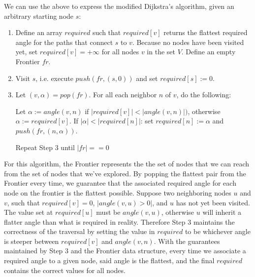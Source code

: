 \documentclass[12pt]{article}
\begin{document}
\par We can use the above to express the modified Dijkstra's algorithm, given an arbitrary starting node $s$:
\begin{enumerate}[Step 1]
  \item Define an array $required$ such that $required[v]$ returns the flattest required angle for the paths that connect $s$ to $v$. Because no nodes have been visited yet, set $required[v] = +\infty$ for all nodes $v$ in the set $V$. Define an empty Frontier $fr$.
  \item Visit $s$, i.e. execute $push(fr, (s, 0))$ and set $required[s] := 0$.
  \item Let $(v,\alpha) = pop(fr)$. For all each neighbor $n$ of $v$, do the following:
  \begin{displayquote}
    Let $\alpha := angle(v,n)$ if $|required[v]| < |angle(v,n)|)$, otherwise $\alpha := required[v]$. If $ |\alpha| < |required[n]|$: set $required[n] := \alpha$ and $push(fr, (n, \alpha))$.
  \end{displayquote}
  Repeat Step 3 until $|fr| == 0$
\end{enumerate}
\par For this algorithm, the Frontier represents the the set of nodes that we can reach from the set of nodes that we've explored. By popping the flattest pair from the Frontier every time, we guarantee that the associated required angle for each node on the frontier is the flattest possible. Suppose two neighboring nodes $u$ and $v$, such that $required[v] = 0$, $|angle(v,u) > 0|$, and $u$ has not yet been visited. The value set at $required[u]$ must be $angle(v,u)$, otherwise $u$ will inherit a flatter angle than what is required in reality. Therefore Step 3 maintains the correctness of the traversal by setting the value in $required$ to be whichever angle is steeper between $required[v]$ and $angle(v,n)$. With the guarantees maintained by Step 3 and the Frontier data structure, every time we associate a required angle to a given node, said angle is the flattest, and the final $required$ contains the correct values for all nodes.
\end{document}
